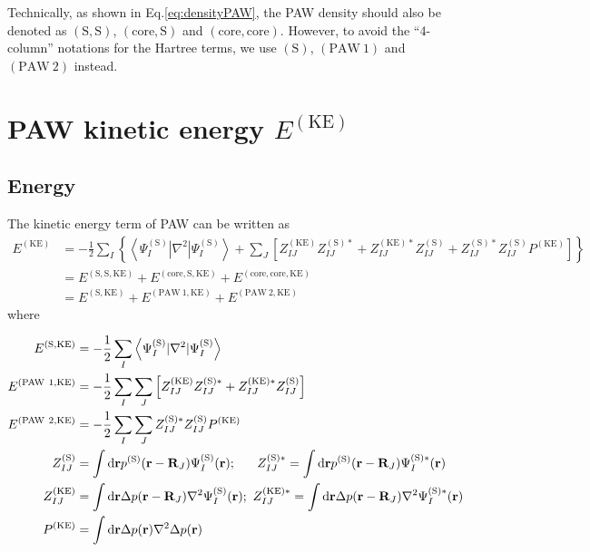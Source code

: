 \documentclass[paper=a4, fontsize=11pt]{article} %
\numberwithin{equation}{section} %
\numberwithin{figure}{section} %
\numberwithin{table}{section} %
\newcommand{\br}{{\bf{r}}}
\newcommand{\bR}{{\bf{R}}}
\newcommand{\rS}{{\mathrm{S}}}
\newcommand{\rKE}{{\mathrm{KE}}}
\newcommand{\rcore}{{\mathrm{core}}}
\newcommand{\rP}{{\mathrm{PAW}}}
\newcommand{\rd}{{\mathrm{d}}}
\begin{document}
Technically, as shown in Eq.\eqref{eq:densityPAW}, the PAW density should also be denoted as $(\rS,\rS)$, $(\rcore,\rS)$ and $(\rcore,\rcore)$. However, to avoid the ``4-column'' notations for the Hartree terms, we use $(\rS)$, $(\rP\ 1)$ and $(\rP\ 2)$ instead.

\newpage
\section{PAW kinetic energy $E^{(\rKE)}$}
\subsection{Energy}
The kinetic energy term of PAW can be written as
\begin{equation} \label{eq:PAWKE}
\begin{split}
E^{(\rKE)}
&=-\frac{1}{2}\sum_I \left\{\left<\Psi_I^{(\rS)}|\nabla^2|\Psi_I^{(\rS)}\right> + \sum_J \left[Z_{IJ}^{(\rKE)}Z_{IJ}^{(\rS)*} + Z_{IJ}^{(\rKE)*}Z_{IJ}^{(\rS)} +  Z_{IJ}^{(\rS)*}Z_{IJ}^{(\rS)}P^{(\rKE)}\right]\right\} \\
&=E^{(\rS,\rS,\rKE)}+ E^{(\rcore,\rS,\rKE)} + E^{(\rcore,\rcore,\rKE)} \\
&= E^{(\rS,\rKE)}+ E^{(\rP\ 1,\rKE)} + E^{(\rP\ 2,\rKE)} 
\end{split}
\end{equation}
where

\begin{equation}
\begin{split}
E^{(\rS,\rKE)}
& = -\frac{1}{2}\sum_I \left<\Psi_I^{(\rS)}|\nabla^2|\Psi_I^{(\rS)}\right> \\
E^{(\rP\ 1,\rKE)}
&= -\frac{1}{2}\sum_I \sum_J \left[Z_{IJ}^{(\rKE)}Z_{IJ}^{(\rS)*} + Z_{IJ}^{(\rKE)*}Z_{IJ}^{(\rS)} \right]\\
E^{(\rP\ 2,\rKE)}
&= -\frac{1}{2}\sum_I \sum_J Z_{IJ}^{(\rS)*}Z_{IJ}^{(\rS)}P^{(\rKE)}\\
Z_{IJ}^{(\rS)}
& = \int \rd\br  p^{(\rS)}( \br -\bR_J )\Psi_I^{(\rS)}(\br);\ \ \ \ \ Z_{IJ}^{(\rS)*}
= \int \rd\br  p^{(\rS)}( \br -\bR_J )\Psi_I^{(\rS)*}(\br)  \\
Z_{IJ}^{(\rKE)}
& = \int \rd\br\Delta p( \br -\bR_J )\nabla^2\Psi_I^{(\rS)}(\br);\ Z_{IJ}^{(\rKE)*}
= \int \rd\br  \Delta p( \br -\bR_J )\nabla^2\Psi_I^{(\rS)*}(\br)   \\
P^{(\rKE)} 
& = \int \rd\br \Delta p(\br)\nabla^2 \Delta p(\br) \\
\end{split}
\end{equation}
\end{document}
